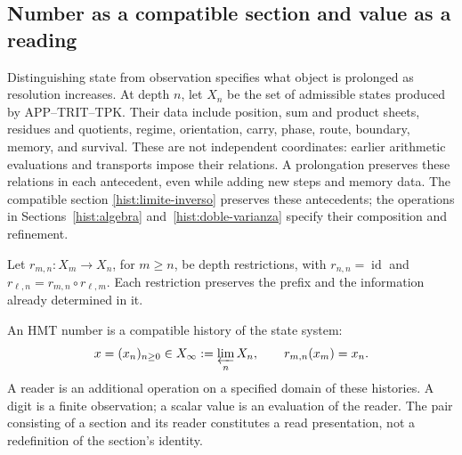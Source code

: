 
\subsection{Number as a compatible section and value as a reading}
\label{hist:seccion}

Distinguishing state from observation specifies what object is prolonged
as resolution increases. At depth \(n\), let \(X_n\) be the set of
admissible states produced by APP--TRIT--TPK. Their data include position,
sum and product sheets, residues and quotients, regime, orientation,
carry, phase, route, boundary, memory, and survival. These are not
independent coordinates: earlier arithmetic evaluations and transports
impose their relations. A prolongation preserves these relations in
each antecedent, even while adding new steps and memory data.
The compatible section \eqref{hist:limite-inverso} preserves these
antecedents; the operations in Sections~\ref{hist:algebra}
and~\ref{hist:doble-varianza} specify their composition and refinement.

Let \(r_{m,n}:X_m\to X_n\), for \(m\geq n\), be depth
restrictions, with \(r_{n,n}=\operatorname{id}\) and
\(r_{\ell,n}=r_{m,n}\circ r_{\ell,m}\). Each restriction preserves
the prefix and the information already determined in it.

\begin{definition}
An HMT number is a compatible history of the state system:
\begin{equation}
 x=(x_n)_{n\geq0}\in X_\infty:=\varprojlim_n X_n,
 \qquad r_{m,n}(x_m)=x_n.
 \label{hist:limite-inverso}
\end{equation}
A reader is an additional operation on a specified domain of these
histories. A digit is a finite observation; a scalar value is an evaluation
of the reader. The pair consisting of a section and its reader constitutes
a read presentation, not a redefinition of the section's identity.
\end{definition}

